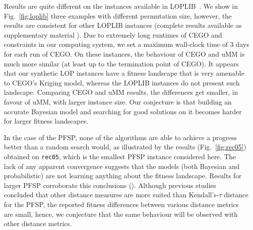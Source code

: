 \documentclass[runningheads]{llncs}
\begin{document}
Results are quite different on the 
instances available in LOPLIB~\citep{}. We show in
Fig.~\ref{fig:loplib} three examples with different permutation size, however,
the results are consistent for other LOPLIB instances (complete results
available as supplementary material \supplement). Due to extremely long
runtimes of CEGO and constraints in our computing system, we set a maximum
wall-clock time of 3 days for each run of CEGO. On these instances, the
behaviour of CEGO and uMM is much more similar (at least up to the termination
point of CEGO). It appears that our synthetic LOP instances have a fitness
landscape that is very amenable to CEGO's Kriging model, whereas the LOPLIB
instances do not present such landscape. Comparing CEGO and uMM results, the
differences get smaller, in favour of uMM, with larger instance size. Our
conjecture is that building an accurate Bayesian model and searching for good
solutions on it becomes harder for larger fitness landscapes.

In the case of the PFSP, none of the algorithms are able to achieve a progress
better than a random search would, as illustrated by the results
(Fig.~\ref{fig:rec05}) obtained on \texttt{rec05}, which is the smallest PFSP
instance considered here. The lack of any apparent convergence suggests that
the models (both Bayesian and probabilistic) are not learning anything about
the fitness landscape. Results for larger PFSP corroborate this conclusions
(\supplement). Although previous studies~\citep{ZaeStoBar2014:ppsn} concluded
that other distance measures are more suited than Kendall's-$\tau$ distance for
the PFSP, the reported fitness differences between various distance metrics are
small, hence, we conjecture that the same behaviour will be observed with other
distance metrics.
  
\end{document}
